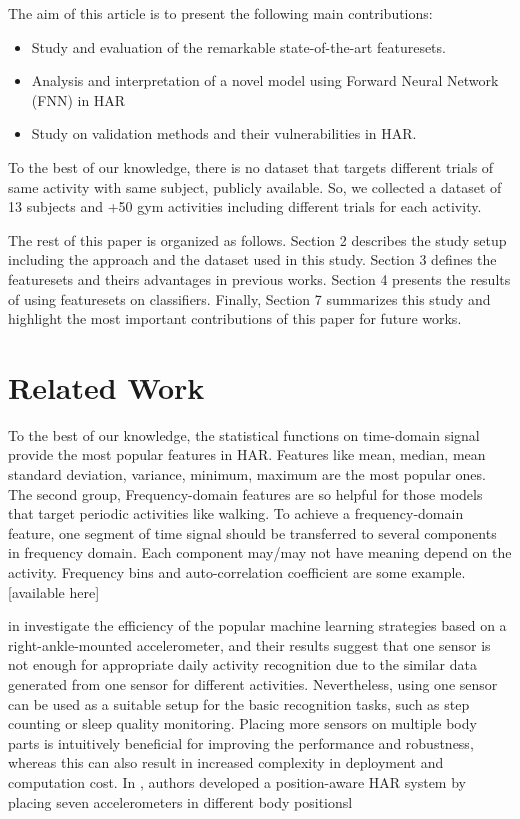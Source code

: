 \documentclass[journal,article,submit,moreauthors,pdftex]{Definitions/mdpi}
\begin{document}
The aim of this article is to present the following main contributions:
\begin{itemize}
	\item Study and evaluation of the remarkable state-of-the-art featuresets.
	\item Analysis and interpretation of a novel model using Forward Neural Network (FNN) in HAR
	\item Study on validation methods and their vulnerabilities in HAR.
\end{itemize}
To the best of our knowledge, there is no dataset that targets different trials of same activity with same subject, publicly available. So, we collected a dataset of 13 subjects and +50 gym activities including different trials for each activity.

The rest of this paper is organized as follows. Section 2 describes the study setup including the approach and the dataset used in this study. Section 3 defines the featuresets and theirs advantages in previous works. Section 4 presents the results of using featuresets on classifiers. Finally, Section 7 summarizes this study and highlight the most important contributions of this paper for future works.
\section{Related Work}
To the best of our knowledge, the statistical functions on time-domain signal provide the most popular features in HAR. Features like mean, median, mean standard deviation, variance, minimum, maximum are the most popular ones. The second group, Frequency-domain features are so helpful for those models that target periodic activities like walking. To achieve a frequency-domain feature, one segment of time signal should be transferred to several components in frequency domain. Each component may/may not have meaning depend on the activity. Frequency bins and auto-correlation coefficient are some example.[available here]

in \cite{Suto et al., 2017} investigate the efficiency of the popular machine learning strategies based on a right-ankle-mounted accelerometer, and their results suggest that one sensor is not enough for appropriate daily activity recognition due to the similar data generated from one sensor for different activities. Nevertheless, using one sensor can be used as a suitable setup for the basic recognition tasks, such as step counting or sleep quality monitoring. Placing more sensors on multiple body parts is intuitively beneficial for improving the performance and robustness, whereas this can also result in increased complexity in deployment and computation cost. In \cite{Sztyler et al.}, authors developed a position-aware HAR system by placing seven accelerometers in different body positionsl
\end{document}
